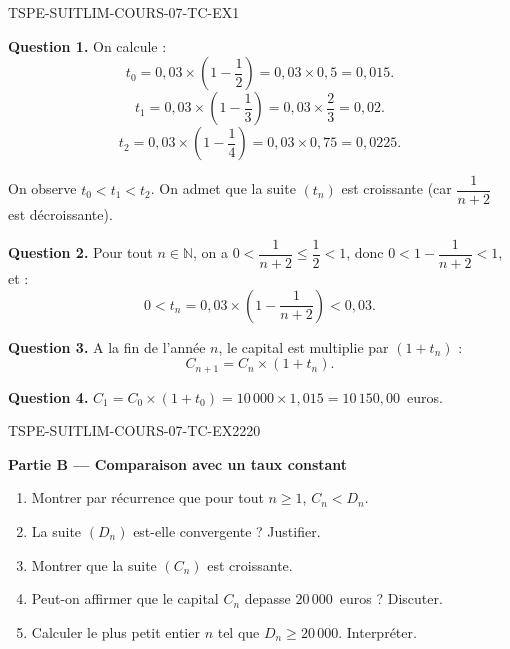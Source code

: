 \begin{corrige}{TSPE-SUITLIM-COURS-07-TC-EX1}


\textbf{Question 1.} On calcule :
\[
  t_0 = 0{,}03 \times \left(1 - \frac{1}{2}\right) = 0{,}03 \times 0{,}5 = 0{,}015.
\]
\[
  t_1 = 0{,}03 \times \left(1 - \frac{1}{3}\right) = 0{,}03 \times \frac{2}{3} = 0{,}02.
\]
\[
  t_2 = 0{,}03 \times \left(1 - \frac{1}{4}\right) = 0{,}03 \times 0{,}75 = 0{,}0225.
\]

On observe $t_0 < t_1 < t_2$. On admet que la suite $(t_n)$ est croissante (car $\dfrac{1}{n+2}$ est décroissante).

\textbf{Question 2.} Pour tout $n \in \mathbb{N}$, on a $0 < \dfrac{1}{n+2} \leq \dfrac{1}{2} < 1$, donc $0 < 1 - \dfrac{1}{n+2} < 1$, et :
\[
  0 < t_n = 0{,}03 \times \left(1 - \frac{1}{n+2}\right) < 0{,}03.
\]

\textbf{Question 3.} A la fin de l'année $n$, le capital est multiplie par $(1 + t_n)$ :
\[
  C_{n+1} = C_n \times (1 + t_n).
\]

\textbf{Question 4.} $C_1 = C_0 \times (1 + t_0) = 10\,000 \times 1{,}015 = 10\,150{,}00$~euros.

\end{corrige}

\bigskip


\begin{exercice}{TSPE-SUITLIM-COURS-07-TC-EX2}{2}{20}

\textbf{Partie B — Comparaison avec un taux constant}

\begin{enumerate}
  \item Montrer par récurrence que pour tout $n \geq 1$, $C_n < D_n$.
  \item La suite $(D_n)$ est-elle convergente ? Justifier.
  \item Montrer que la suite $(C_n)$ est croissante.
  \item Peut-on affirmer que le capital $C_n$ depasse $20\,000$~euros ? Discuter.
  \item Calculer le plus petit entier $n$ tel que $D_n \geq 20\,000$. Interpréter.
\end{enumerate}

\end{exercice}

